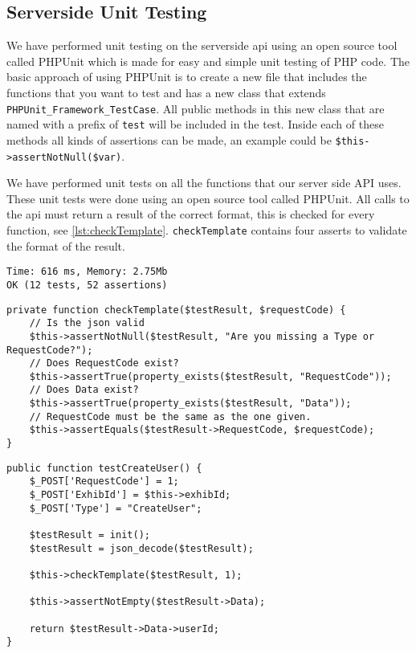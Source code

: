 \subsection*{Serverside Unit Testing}
We have performed unit testing on the serverside api using an open source tool called PHPUnit\citep{phpunit} which is made for easy and simple unit testing of PHP code. The basic approach of using PHPUnit is to create a new file that includes the functions that you want to test and has a new class that extends \lstinline|PHPUnit_Framework_TestCase|. All public methods in this new class that are named with a prefix of \lstinline|test| will be included in the test. Inside each of these methods all kinds of assertions can be made, an example could be \lstinline|$this->assertNotNull($var)|.


We have performed unit tests on all the functions that our server side API uses. These unit tests were done using an open source tool called PHPUnit\citep{phpunit}. All calls to the api must return a result of the correct format, this is checked for every function, see \autoref{lst:checkTemplate}. \lstinline{checkTemplate} contains four asserts to validate the format of the result.
 
\begin{lstlisting}[numbers=none, basicstyle=\ttfamily]
Time: 616 ms, Memory: 2.75Mb
OK (12 tests, 52 assertions)
\end{lstlisting}

\begin{lstlisting}[language=phpstyle, label=lst:checkTemplate, caption={checkTemplate unit test}]
private function checkTemplate($testResult, $requestCode) {
    // Is the json valid
    $this->assertNotNull($testResult, "Are you missing a Type or RequestCode?");
    // Does RequestCode exist?
    $this->assertTrue(property_exists($testResult, "RequestCode"));
    // Does Data exist?
    $this->assertTrue(property_exists($testResult, "Data"));    
    // RequestCode must be the same as the one given.
    $this->assertEquals($testResult->RequestCode, $requestCode);
}
\end{lstlisting}%

\begin{lstlisting}[language=phpstyle, label=lst:testCreateUser, caption={createUser unit test}]
public function testCreateUser() {
    $_POST['RequestCode'] = 1;
    $_POST['ExhibId'] = $this->exhibId;
    $_POST['Type'] = "CreateUser";

    $testResult = init();
    $testResult = json_decode($testResult);

    $this->checkTemplate($testResult, 1);

    $this->assertNotEmpty($testResult->Data);
    
    return $testResult->Data->userId;      
}
\end{lstlisting}%

